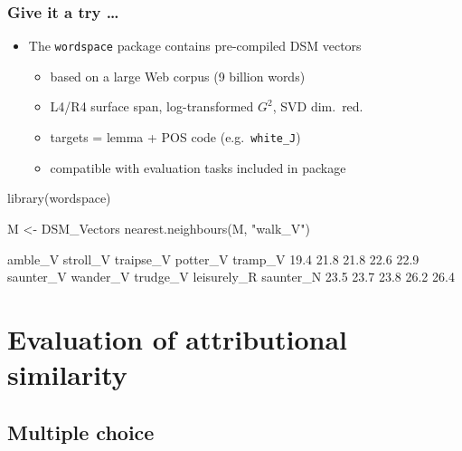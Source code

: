 \documentclass[t]{beamer} %
\begin{document}
\begin{frame}[fragile]
  \frametitle{Give it a try \ldots}
  
  \begin{itemize}
  \item The \texttt{wordspace} package contains pre-compiled DSM vectors
    \begin{itemize}
    \item based on a large Web corpus (9 billion words)
    \item L4/R4 surface span, log-transformed $G^2$, SVD dim.\ red.
    \item targets = lemma + POS code (e.g.\ \texttt{white\_J})
    \item compatible with evaluation tasks included in package
    \end{itemize}
  \end{itemize}

\begin{Rcode}
library(wordspace)

M <- DSM_Vectors
nearest.neighbours(M, "walk_V")\begin{Rout}
    amble_V    stroll_V   traipse_V    potter_V     tramp_V 
       19.4        21.8        21.8        22.6        22.9 
  saunter_V    wander_V    trudge_V leisurely_R   saunter_N 
       23.5        23.7        23.8        26.2        26.4\end{Rout}
\end{Rcode}
\end{frame}


\section{Evaluation of attributional similarity}

\subsection{Multiple choice}
\end{document}
